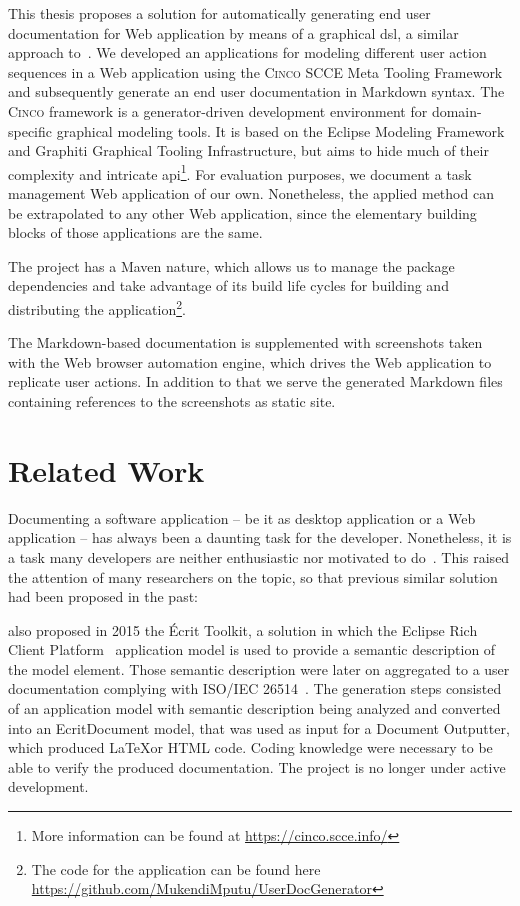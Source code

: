 This thesis proposes a solution for automatically generating end user documentation for Web application by means of a graphical \gls*{dsl}, a similar approach to~\cite{bosselmann-et_al}. We developed an applications for modeling different user action sequences in a Web application using the \textsc{Cinco} SCCE Meta Tooling Framework~\cite{Cinco} and subsequently generate an end user documentation in Markdown syntax. The \textsc{Cinco} framework is a generator-driven development environment for domain-specific graphical modeling tools. It is based on the Eclipse Modeling Framework and Graphiti Graphical Tooling Infrastructure, but aims to hide much of their complexity and intricate \gls{api}\footnote{More information can be found at \url{https://cinco.scce.info/}}. For evaluation purposes, we document a task management Web application of our own. Nonetheless, the applied method can be extrapolated to any other Web application, since the elementary building blocks of those applications are the same.

The project has a Maven nature, which allows us to manage the package dependencies and take advantage of its build life cycles for building and distributing the application\footnote{The code for the application can be found here \url{https://github.com/MukendiMputu/UserDocGenerator}}.

The Markdown-based documentation is supplemented with screenshots taken with the Web browser automation engine, which drives the Web application to replicate user actions. In addition to that we serve the generated Markdown files containing references to the screenshots as static site.

\section{Related Work}\label{sec:relWork}

Documenting a software application -- be it as desktop application or a Web application -- has always been a daunting task for the developer. Nonetheless, it is a task many developers are neither enthusiastic nor motivated to do~\cite{kipyegen2013importance}. This raised the attention of many researchers on the topic, so that previous similar solution had been proposed in the past:

\cite{descher_et-al} also proposed in 2015 the Écrit Toolkit, a solution in which the Eclipse Rich Client Platform~\cite{eclipseRCP} application model is used to provide a semantic description of the model element. Those semantic description were later on aggregated to a user documentation complying with ISO/IEC 26514~\cite{descher_et-al}. The generation steps consisted of an application model with semantic description being analyzed and converted into an EcritDocument model, that was used as input for a Document Outputter, which produced \LaTeX or HTML code. Coding knowledge were necessary to be able to verify the produced documentation. The project is no longer under active development.


